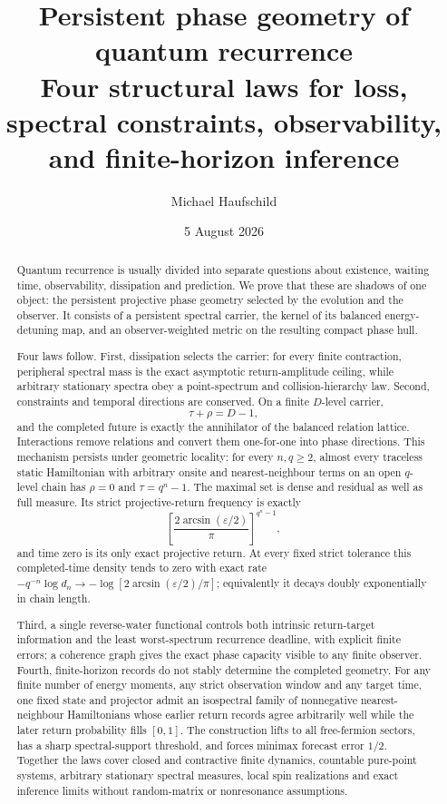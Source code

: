 \documentclass[10pt]{article}
\title{\textbf{Persistent phase geometry of quantum recurrence}\\
\large Four structural laws for loss, spectral constraints, observability, and finite-horizon inference}
\author{Michael Haufschild}
\date{5 August 2026}
\theoremstyle{definition}
\begin{document}
\maketitle

\begin{abstract}
Quantum recurrence is usually divided into separate questions about existence,
waiting time, observability, dissipation and prediction.  We prove that these
are shadows of one object: the persistent projective phase geometry selected
by the evolution and the observer.  It consists of a persistent spectral
carrier, the kernel of its balanced energy-detuning map, and an
observer-weighted metric on the resulting compact phase hull.

Four laws follow.  First, dissipation selects the carrier: for every finite
contraction, peripheral spectral mass is the exact asymptotic return-amplitude
ceiling, while arbitrary stationary spectra obey a point-spectrum and
collision-hierarchy law.  Second, constraints and temporal directions are
conserved.  On a finite $D$-level carrier,
\[
  \tau+\rho=D-1,
\]
and the completed future is exactly the annihilator of the balanced relation
lattice.  Interactions remove relations and convert them one-for-one into
phase directions.  This mechanism persists under geometric locality: for
every $n,q\ge2$, almost every traceless static Hamiltonian with arbitrary
onsite and nearest-neighbour terms on an open $q$-level chain has
$\rho=0$ and $\tau=q^n-1$.  The maximal set is dense and residual as well
as full measure.  Its strict projective-return frequency is exactly
\[
 \left[\frac{2\arcsin(\varepsilon/2)}{\pi}\right]^{q^n-1},
\]
and time zero is its only exact projective return.  At every fixed strict
tolerance this completed-time density tends to zero with exact rate
$-q^{-n}\log d_n\to-\log[2\arcsin(\varepsilon/2)/\pi]$; equivalently it
decays doubly exponentially in chain length.

Third, a single reverse-water functional controls both intrinsic return-target
information and the least worst-spectrum recurrence deadline, with explicit
finite errors; a coherence graph gives the exact phase capacity visible to
any finite observer.  Fourth, finite-horizon records do not stably determine
the completed geometry.  For any finite number of energy moments, any strict observation
window and any target time, one fixed state and projector admit an isospectral
family of nonnegative nearest-neighbour Hamiltonians whose earlier return
records agree arbitrarily well while the later return probability fills
$[0,1]$.  The construction lifts to all free-fermion sectors, has a sharp
spectral-support threshold, and forces minimax forecast error $1/2$.
Together the laws cover closed and contractive finite dynamics, countable
pure-point systems, arbitrary stationary spectral measures, local spin
realizations and exact inference limits without random-matrix or
nonresonance assumptions.
\end{abstract}
\end{document}
